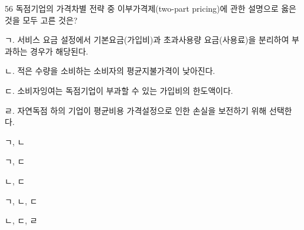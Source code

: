 \begin{question}{56}
독점기업의 가격차별 전략 중 이부가격제(two-part pricing)에 관한 설명으로 옳은 것을 모두 고른 것은?
\begin{framedtext}
ㄱ. 서비스 요금 설정에서 기본요금(가입비)과 초과사용량 요금(사용료)을 분리하여 부과하는 경우가 해당된다. \par
ㄴ. 적은 수량을 소비하는 소비자의 평균지불가격이 낮아진다. \par
ㄷ. 소비자잉여는 독점기업이 부과할 수 있는 가입비의 한도액이다. \par
ㄹ. 자연독점 하의 기업이 평균비용 가격설정으로 인한 손실을 보전하기 위해 선택한다. \par
\end{framedtext}
\begin{choices}
  \item ㄱ, ㄴ
  \item ㄱ, ㄷ
  \item ㄴ, ㄷ
  \item ㄱ, ㄴ, ㄷ
  \item ㄴ, ㄷ, ㄹ
\end{choices}
\end{question}

